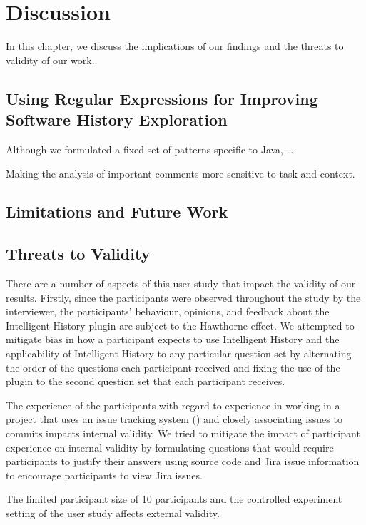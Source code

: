 \chapter{Discussion}
\label{ch:Discussion}

In this chapter, we discuss the implications of our findings and the threats to validity of our work.


\section{Using Regular Expressions for Improving Software History Exploration}

Although we formulated a fixed set of patterns specific to Java, \dots {}

Making the analysis of important comments more sensitive to task and context.


\section{Limitations and Future Work}


\section{Threats to Validity}

There are a number of aspects of this user study that impact the validity of our results.
Firstly, since the participants were observed throughout the study by the interviewer, the participants' behaviour, opinions, and feedback about the Intelligent History plugin are subject to the Hawthorne effect.
We attempted to mitigate bias in how a participant expects to use Intelligent History and the applicability of Intelligent History to any particular question set 
by alternating the order of the questions each participant received and 
fixing the use of the plugin to the second question set that each participant receives.

The experience of the participants with regard to experience in working in a project that uses an issue tracking system () and closely associating issues to commits impacts internal validity.
We tried to mitigate the impact of participant experience on internal validity by formulating questions that would require participants to justify their answers using source code and Jira issue information to
encourage participants to view Jira issues.

The limited participant size of 10 participants and the controlled experiment setting of the user study affects external validity.

\endinput

Any text after an \endinput is ignored.
You could put scraps here or things in progress.